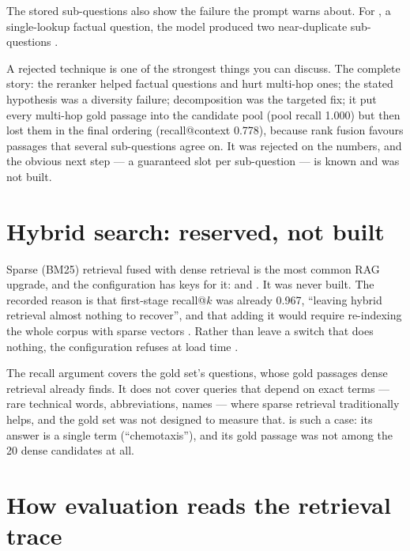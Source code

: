The stored sub-questions also show the failure the prompt warns about. For , a single-lookup factual question, the model produced two near-duplicate sub-questions \tagM.

\begin{interview}
A rejected technique is one of the strongest things you can discuss. The complete story: the reranker helped factual questions and hurt multi-hop ones; the stated hypothesis was a diversity failure; decomposition was the targeted fix; it put every multi-hop gold passage into the candidate pool (pool recall 1.000) but then lost them in the final ordering (recall@context 0.778), because rank fusion favours passages that several sub-questions agree on. It was rejected on the numbers, and the obvious next step --- a guaranteed slot per sub-question --- is known and was not built.
\end{interview}

\section{Hybrid search: reserved, not built}

Sparse (BM25) retrieval fused with dense retrieval is the most common RAG upgrade, and the configuration has keys for it:  and . It was never built. The recorded reason is that first-stage recall@$k$ was already 0.967, \enquote{leaving hybrid retrieval almost nothing to recover}, and that adding it would require re-indexing the whole corpus with sparse vectors . Rather than leave a switch that does nothing, the configuration refuses  at load time .

\begin{inferred}
The recall argument covers the gold set's questions, whose gold passages dense retrieval already finds. It does not cover queries that depend on exact terms --- rare technical words, abbreviations, names --- where sparse retrieval traditionally helps, and the gold set was not designed to measure that.  is such a case: its answer is a single term (\enquote{chemotaxis}), and its gold passage was not among the 20 dense candidates at all.
\end{inferred}

\section{How evaluation reads the retrieval trace}

